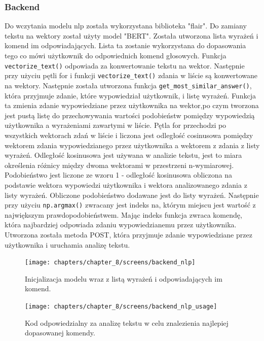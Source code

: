 \subsubsection{Backend}
Do wczytania modelu nlp została wykorzystana biblioteka "flair". Do zamiany tekstu na wektory został użyty model "BERT". Została utworzona lista wyrażeń i komend im odpowiadających. Lista ta zostanie  wykorzystana do dopasowania tego co mówi użytkownik do odpowiednich komend głosowych. Funkcja \texttt{vectorize\_text()} odpowiada za konwertowanie tekstu na wektor. Następnie przy użyciu pętli for i funkcji \texttt{vectorize\_text()} zdania w liście są konwertowane na wektory. Następnie została utworzona funkcja \texttt{get\_most\_similar\_answer()}, która przyjmuje zdanie, które wypowiedział użytkownik, i listę wyrażeń. Funkcja ta zmienia zdanie wypowiedziane przez użytkownika na wektor,po czym tworzona jest pustą listę do przechowywania wartości podobieństw pomiędzy wypowiedzią użytkownika a wyrażeniami zawartymi w liście. Pętla for przechodzi po wszystkich wektorach zdań w liście i liczona jest odległość cosinusowa pomiędzy wektorem zdania wypowiedzianego przez użytkownika a wektorem z zdania z listy wyrażeń. Odległość kosinusowa jest używana w analizie tekstu, jest to miara określenia różnicy między dwoma wektorami w przestrzeni n-wymiarowej.\cite{dataMining} Podobieństwo jest liczone ze wzoru 1 - odległość kosinusowa obliczona na podstawie wektora wypowiedzi użytkownika i wektora analizowanego zdania z listy wyrażeń. Obliczone podobieństwo dodawane jest do listy wyrażeń. Następnie przy użyciu \texttt{np.argmax()} zwracany jest indeks na, którym miejscu jest wartość z największym prawdopodobieństwem. Mając indeks funkcja zwraca komendę, która  najbardziej odpowiada zdaniu wypowiedzianemu przez użytkownika. Utworzona została metoda POST, która przyjmuje zdanie wypowiedziane przez użytkownika i uruchamia analizę tekstu.


\begin{figure}[H]
    \centering
    \texttt{[image: chapters/chapter\_8/screens/backend\_nlp]}
    \caption{Inicjalizacja modelu wraz z listą wyrażeń i odpowiadających im komend.}
    \label{img:backend_nlp}
\end{figure}


\begin{figure}[H]
    \centering
    \texttt{[image: chapters/chapter\_8/screens/backend\_nlp\_usage]}
    \caption{Kod odpowiedzialny za analizę tekstu w celu znalezienia najlepiej dopasowanej komendy.}
    \label{img:backend_nlp_usage}
\end{figure}


